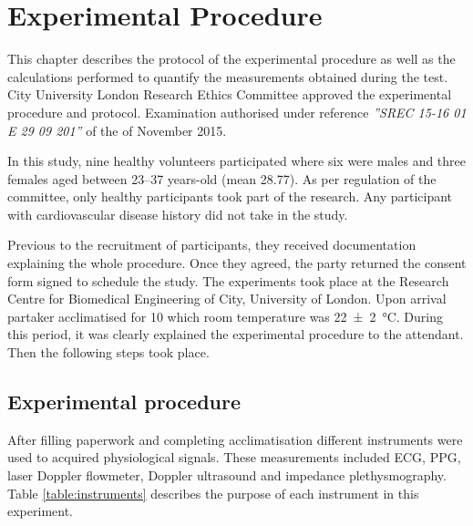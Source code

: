 
\chapter{Experimental Procedure}  %
\label{chapter procedure}

\ifpdf
    \graphicspath{{Chapter5/Figs/Raster/}{Chapter5/Figs/PDF/}{Chapter5/Figs/}}
\else
    \graphicspath{{Chapter5/Figs/Vector/}{Chapter5/Figs/}}
\fi

This chapter describes the protocol of the experimental procedure as well as the calculations performed to quantify the measurements obtained during the test. City University London Research Ethics Committee approved the experimental procedure and protocol. Examination authorised under reference \textit{''SREC 15-16 01 E 29 09 201''} of the  of November 2015. 

In this study, nine healthy volunteers participated where six were males and three females aged between \numrange{23}{37} years-old (mean 28.77). As per regulation of the committee, only healthy participants took part of the research. Any participant with cardiovascular disease history did not take in the study. 

Previous to the recruitment of participants, they received documentation explaining the whole procedure. Once they agreed, the party returned the consent form signed to schedule the study. The experiments took place at the Research Centre for Biomedical Engineering of City, University of London. Upon arrival partaker acclimatised for \SI{10}{\min} which room temperature was \SI{22(2)}{\degreeCelsius}. During this period, it was clearly explained the experimental procedure to the attendant. Then the following steps took place.


\section{Experimental procedure} %
\label{section procedure 1}

After filling paperwork and completing acclimatisation different instruments were used to acquired physiological signals. These measurements included ECG, PPG, laser Doppler flowmeter, Doppler ultrasound and impedance plethysmography. Table \ref{table:instruments} describes the purpose of each instrument in this experiment. 


